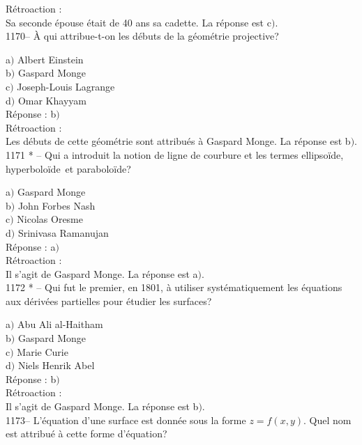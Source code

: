 ﻿\documentclass[letterpaper, 12pt]{article}
\begin{document}
R\'etroaction : \\
Sa seconde \'epouse \'etait de 40 ans sa cadette.
La r\'eponse est c$)$.\\

1170-- \`A qui attribue-t-on les d\'ebuts de la g\'eom\'etrie
projective?

a$)$ Albert Einstein \\
b$)$ Gaspard Monge \\
c$)$ Joseph-Louis Lagrange \\
d$)$ Omar Khayyam\\

R\'eponse : b$)$\\

R\'etroaction : \\
Les d\'ebuts de cette g\'eom\'etrie sont attribu\'es \`a Gaspard
Monge.
La r\'eponse est b$)$.\\

1171 * -- Qui a introduit la notion de ligne de courbure et les
termes \og ellipso\"ide\fg , \og hyperbolo\"ide\fg\ et \og
parabolo\"ide\fg ?

a$)$ Gaspard Monge \\
b$)$ John Forbes Nash \\
c$)$ Nicolas Oresme \\
d$)$ Srinivasa Ramanujan\\

R\'eponse : a$)$\\

R\'etroaction : \\
Il s'agit de Gaspard Monge.
La r\'eponse est a$)$.\\

1172 * -- Qui fut le premier, en 1801, \`a utiliser
syst\'ematiquement les \'equations aux d\'eriv\'ees partielles pour
\'etudier les surfaces?

a$)$ Abu Ali al-Haitham \\
b$)$ Gaspard Monge \\
c$)$ Marie Curie \\
d$)$ Niels Henrik Abel\\

R\'eponse : b$)$\\

R\'etroaction : \\
Il s'agit de Gaspard Monge.
La r\'eponse est b$)$.\\

1173-- L'\'equation d'une surface est donn\'ee sous la forme
$z=f(x,y)$. Quel nom est attribu\'e \`a cette forme d'\'equation?
\end{document}
